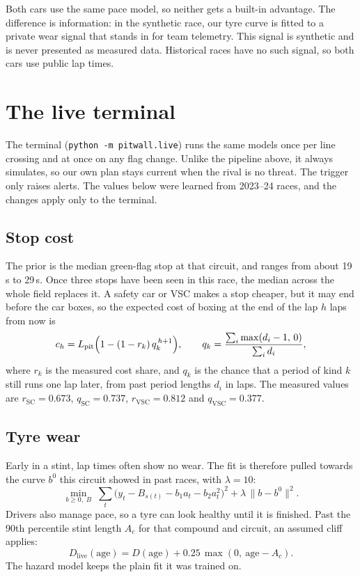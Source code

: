 \documentclass[11pt,a4paper]{article}
\begin{document}
Both cars use the same pace model, so neither gets a built-in advantage. The difference
is information: in the synthetic race, our tyre curve is fitted to a private wear signal
that stands in for team telemetry. This signal is synthetic and is never presented as
measured data. Historical races have no such signal, so both cars use public lap times.

\section{The live terminal}

The terminal (\texttt{python -m pitwall.live}) runs the same models once per line crossing
and at once on any flag change. Unlike the pipeline above, it always simulates, so our own
plan stays current when the rival is no threat. The trigger only raises alerts. The values
below were learned from 2023--24 races, and the changes apply only to the terminal.

\subsection{Stop cost}
The prior is the median green-flag stop at that circuit, and ranges from about 19\,s to
29\,s. Once three stops have been seen in this race, the median across the whole field
replaces it. A safety car or VSC makes a stop cheaper, but it may end before the car boxes,
so the expected cost of boxing at the end of the lap $h$ laps from now is
\begin{equation}
c_h = L_{\text{pit}}\Bigl(1-(1-r_k)\,q_k^{\,h+1}\Bigr),
\qquad
q_k = \frac{\sum_i \max(d_i-1,\,0)}{\sum_i d_i},
\end{equation}
where $r_k$ is the measured cost share, and $q_k$ is the chance that a period of kind $k$
still runs one lap later, from past period lengths $d_i$ in laps. The measured values are
$r_{\text{SC}}=0.673$, $q_{\text{SC}}=0.737$, $r_{\text{VSC}}=0.812$ and $q_{\text{VSC}}=0.377$.

\subsection{Tyre wear}
Early in a stint, lap times often show no wear. The fit is therefore pulled towards the
curve $b^{0}$ this circuit showed in past races, with $\lambda=10$:
\begin{equation}
\min_{b\ge 0,\;B}\; \sum_t \bigl(y_t - B_{s(t)} - b_1 a_t - b_2 a_t^2\bigr)^2
+ \lambda\,\lVert b-b^{0}\rVert^2 .
\end{equation}
Drivers also manage pace, so a tyre can look healthy until it is finished. Past the 90th
percentile stint length $A_c$ for that compound and circuit, an assumed cliff applies:
\begin{equation}
D_{\text{live}}(\text{age}) = D(\text{age}) + 0.25\,\max(0,\ \text{age}-A_c).
\end{equation}
The hazard model keeps the plain fit it was trained on.
\end{document}
